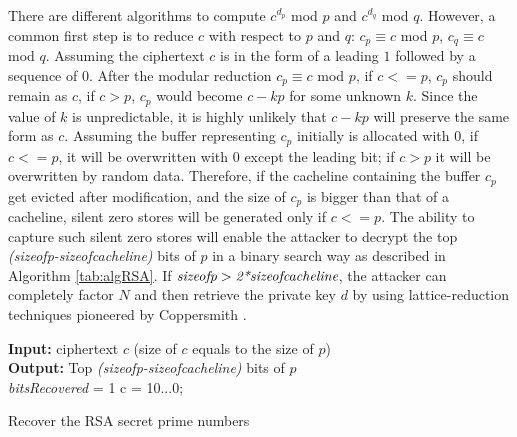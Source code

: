\documentclass{iacrtrans}
\begin{document}
There are different algorithms to compute $c^{d_p}$ mod $p$ and $c^{d_q}$ mod $q$. However, a common first step is to reduce $c$ with respect to $p$ and $q$: $c_p \equiv c$ mod $p$, $c_q \equiv c$ mod $q$. Assuming the ciphertext $c$ is in the form of a leading $1$ followed by a sequence of $0$. After the modular reduction $c_p \equiv c$ mod $p$, if $c<=p$, $c_p$ should remain as $c$, if $c>p$, $c_p$ would become $c-kp$ for some unknown $k$. Since the value of $k$ is unpredictable, it is highly unlikely that $c-kp$ will preserve the same form as $c$. Assuming the buffer representing $c_p$ initially is allocated with $0$, if $c<=p$, it will be overwritten with $0$ except the leading bit; if $c>p$ it will be overwritten by random data. Therefore, if the cacheline containing the buffer $c_p$ get evicted after modification, and the size of $c_p$ is bigger than that of a cacheline, silent zero stores will be generated only if $c<=p$. The ability to capture such silent zero stores will enable the attacker to decrypt the top \emph{(sizeofp-sizeofcacheline)} bits of $p$ in a binary search way as described in Algorithm \ref{tab:algRSA}. If $\emph{sizeofp} > \emph{2*sizeofcacheline}$, the attacker can completely factor $N$ and then retrieve the private key $d$ by using lattice-reduction techniques pioneered by Coppersmith \cite{coppersmith1997small}. 
\begin{algorithm}[H]
\SetAlgoLined
\textbf{Input: } ciphertext $c$ (size of $c$ equals to the size of $p$) \\
\textbf{Output: } Top \emph{(sizeofp-sizeofcacheline)} bits of $p$ \\
 \emph{bitsRecovered} = 1\;
 c = 10...0; \;
 \caption{Recover the RSA secret prime numbers}
 \label{tab:algRSA}
\end{algorithm}
\end{document}
